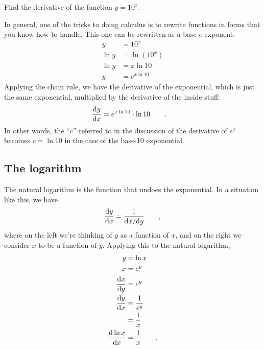 \begin{eg}
\egquestion Find the derivative of the function $y=10^x$.

\eganswer In general, one of the tricks to doing calculus is to rewrite functions in forms that
you know how to handle. This one can be rewritten as a base-$e$ exponent:
\begin{align*}
  y &= 10^x \\
  \ln y &= \ln\left(10^x\right) \\
  \ln y &= x \ln 10 \\
  y &= e^{x\ln 10}
\end{align*}
Applying the chain rule, we have the derivative of the exponential, which is just the same
exponential, multiplied by the derivative of the inside stuff:
\begin{align*}
  \frac{\textup{d} y}{\textup{d} x} &= e^{x\ln 10} \cdot \ln 10 \qquad .
\end{align*}
In other words, the ``$c$'' referred to in the discussion of the derivative of $e^x$ becomes
$c=\ln 10$ in the case of the base-10 exponential.
\end{eg}

\subsection{The logarithm}

The natural logarithm is the function that undoes the exponential. In a situation like this, we
have
\begin{equation*}
  \frac{\textup{d} y}{\textup{d} x} = \frac{1}{\textup{d} x/\textup{d} y} \qquad ,
\end{equation*}
where on the left we're thinking of $y$ as a function of $x$, and on the right we consider
$x$ to be a function of $y$. Applying this to the natural logarithm,
\begin{align*}
  y &= \ln x \\
  x &= e^y \\
  \frac{\textup{d} x}{\textup{d} y} &= e^y \\
  \frac{\textup{d} y}{\textup{d} x} &= \frac{1}{e^y} \\
                        & = \frac{1}{x} \\
  \frac{\textup{d} \ln x}{\textup{d} x} &= \frac{1}{x} \qquad .
\end{align*}



